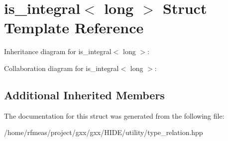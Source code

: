 \hypertarget{structis__integral_3_01long_01_4}{}\section{is\+\_\+integral$<$ long $>$ Struct Template Reference}
\label{structis__integral_3_01long_01_4}


Inheritance diagram for is\+\_\+integral$<$ long $>$\+:


Collaboration diagram for is\+\_\+integral$<$ long $>$\+:
\subsection*{Additional Inherited Members}


The documentation for this struct was generated from the following file\+:\begin{DoxyCompactItemize}
\item 
/home/rfmeas/project/gxx/gxx/\+H\+I\+D\+E/utility/type\+\_\+relation.\+hpp\end{DoxyCompactItemize}
